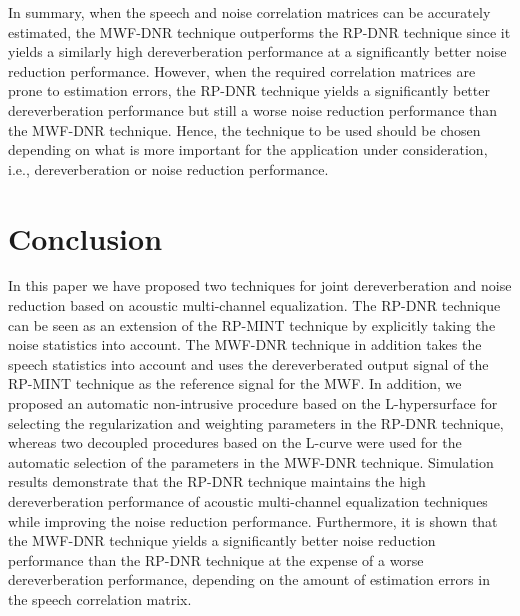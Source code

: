 \documentclass[draftcls,onecolumn,11pt]{IEEEtran}
\begin{document}
In summary, when the speech and noise correlation matrices can be accurately estimated, the MWF-DNR technique outperforms the RP-DNR technique since it yields a similarly high dereverberation performance at a significantly better noise reduction performance. 
However, when the required correlation matrices are prone to estimation errors, the RP-DNR technique yields a significantly better dereverberation performance but still a worse noise reduction performance than the MWF-DNR technique. 
Hence, the technique to be used should be chosen depending on what is more important for the application under consideration, i.e., dereverberation or noise reduction performance. 

\section{Conclusion}
In this paper we have proposed two techniques for joint dereverberation and noise reduction based on acoustic multi-channel equalization.
The RP-DNR technique can be seen as an extension of the RP-MINT technique by explicitly taking the noise statistics into account. 
The MWF-DNR technique in addition takes the speech statistics into account and uses the dereverberated output signal of the RP-MINT technique as the reference signal for the MWF.
In addition, we proposed an automatic non-intrusive procedure based on the L-hypersurface for selecting the regularization and weighting parameters in the RP-DNR technique, whereas two decoupled procedures based on the L-curve were used for the automatic selection of the parameters in the MWF-DNR technique.
Simulation results demonstrate that the RP-DNR technique maintains the high dereverberation performance of acoustic multi-channel equalization techniques while improving the noise reduction performance. 
Furthermore, it is shown that the MWF-DNR technique yields a significantly better noise reduction performance than the RP-DNR technique at the expense of a worse dereverberation performance, depending on the amount of estimation errors in the speech correlation matrix.




\end{document}
